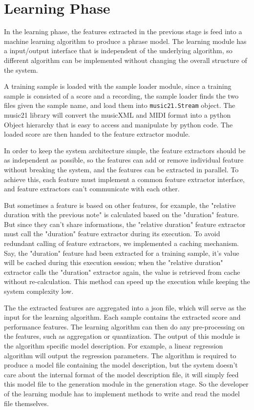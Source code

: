 

   \section{Learning Phase}
   In the learning phase, the features extracted in the previous stage is feed into a machine learning algorithm to produce a phrase model. The learning module has a input/output interface that is independent of the underlying algorithm, so different algorithm can be implemented without changing the overall structure of the system.

   A training sample is loaded with the sample loader module, since a training sample is consisted of a score and a recording, the sample loader finds the two files given the sample name, and load them into \texttt{music21.Stream} object. The music21 library will convert the musicXML and MIDI format into a python Object hierarchy that is easy to access and manipulate by python code. The loaded score are then handed to the feature extractor module.

   In  order to keep the system architecture simple, the feature extractors should be as independent as possible, so the features can add or remove individual feature without breaking the system, and the features can be extracted in parallel. To achieve this, each feature must implement a common feature extractor interface, and feature extractors can't communicate with each other. 

   But sometimes a feature is based on other features, for example, the "relative duration with the previous note" is calculated based on the "duration" feature. But since they can't share informations, the "relative duration" feature extractor must call the "duration" feature extractor during its execution. To avoid redundant calling of feature extractors, we implemented a caching mechanism. Say, the "duration" feature had been extracted for a training sample, it's value will be cached during this execution session; when the "relative duration" extractor calls the "duration" extractor again, the value is retrieved from cache without re-calculation.  This method can speed up the execution while keeping the system complexity low.

   The the extracted features are aggregated into a json file, which will serve as the input for the learning algorithm. Each sample contains the extracted score and performance features. The learning algorithm can then do any pre-processing on the features, such as aggregation or quantization. The output of this module is the algorithm specific model description. For example, a linear regression algorithm will output the regression parameters. The algorithm is required to produce a model file containing the model description, but the system doesn't care about the internal format of the model description file, it will simply feed this model file to the generation module in the generation stage. So the developer of the learning module has to implement methods to write and read the model file themselves.

